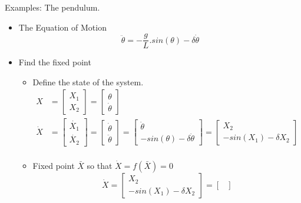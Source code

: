 Examples: The pendulum.
\begin{itemize}
  \item The Equation of Motion
    \begin{equation}
      \ddot{\theta} = -\frac{g}{L}.sin(\theta) - \delta\dot{\theta}
    \end{equation}
  \item Find the fixed point
    \begin{itemize}
      \item Define the state of the system.
        \begin{equation}
          \begin{aligned}
          X &=  \begin{bmatrix} X_{1} \\ X_{2} \end{bmatrix} = 
                \begin{bmatrix}  {\theta} \\ {\dot{\theta} } \end{bmatrix} \\
          \dot{X} &=  \begin{bmatrix} \dot{X_{1}} \\ \dot{X_{2}} \end{bmatrix} = 
                      \begin{bmatrix} \dot{\theta} \\ \ddot{\theta}  \end{bmatrix} =
                      \begin{bmatrix} \dot{\theta} \\ -sin(\theta) -{\delta\dot{\theta}}  \end{bmatrix} = 
                      \begin{bmatrix} X_{2}\\ -sin(X_{1}) -{\delta X_{2} } \end{bmatrix} \\
          \end{aligned}
          \end{equation}
      \item Fixed point $\bar{X}$ so that $\dot{X} = f(\bar{X}) = 0$
        \begin{equation}
            \dot{X} =  
              \begin{bmatrix} 
                X_{2}\\ -sin(X_{1}) -\delta X_{2} 
              \end{bmatrix} 
              =
              \begin{bmatrix} 

\end{bmatrix}
\end{equation}
\end{itemize}
\end{itemize}
